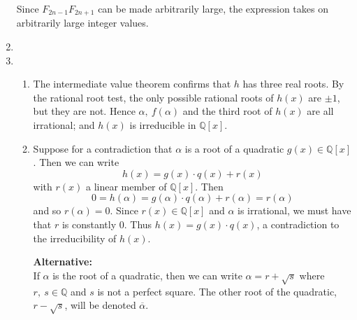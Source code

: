 \documentclass[12pt]{article}
\begin{document}
\begin{enumerate}
Since $F_{2n - 1} F_{2n + 1}$ can be made arbitrarily large, the expression
takes on arbitrarily large integer values.

\item %


\item %

\begin{enumerate}[label=(\alph*)]

\item The intermediate value theorem confirms that $h$ has three real 
roots. By the rational root test, the only possible rational roots 
of $h(x)$ are $\pm 1$, but they are not. Hence $\alpha, \ f(\alpha)$ and 
the third root of $h(x)$ are all irrational; and $h(x)$ is irreducible 
in $\mathbb{Q} [x]$.

\item Suppose for a contradiction that $\alpha$ is a root of a quadratic 
$g(x) \in \mathbb{Q} [x]$. Then we can write
$$
h(x) = g(x) \cdot q(x) + r(x)
$$
with $r(x)$ a linear member of $\mathbb{Q} [x]$. Then 
$$
0 = h(\alpha) = g(\alpha) \cdot q(\alpha) + r(\alpha) = r(\alpha)
$$
and so $r(\alpha) = 0$. Since $r(x) \in \mathbb{Q} [x]$ and $\alpha$ is irrational, 
we must have that $r$ is constantly 0. Thus $h(x) = g(x) \cdot q(x)$, 
a contradiction to the irreducibility of $h(x)$.

{\bf{Alternative:}}\\
If $\alpha$ is the root of a quadratic, then we can write
$\alpha = r + \sqrt{s}$ where $r, \ s \in \mathbb{Q}$ and $s$ is not a
perfect square. The other root of the quadratic, $r - \sqrt{s}$,
will be denoted $\overline{\alpha}$.


\end{enumerate}
\end{enumerate}
\end{document}
